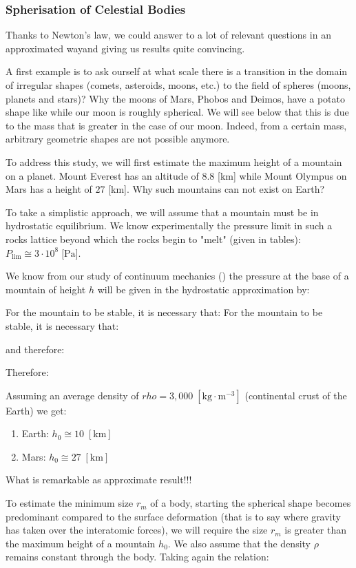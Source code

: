 	\subsubsection{Spherisation of Celestial Bodies}
	Thanks to Newton's law, we could answer to a lot of relevant questions in an approximated wayand giving us results quite convincing.

	A first example is to ask ourself at what scale there is a transition in the domain of irregular shapes (comets, asteroids, moons, etc.) to the field of spheres (moons, planets and stars)? Why the moons of Mars, Phobos and Deimos, have a potato shape like while our moon is roughly spherical. We will see below that this is due to the mass that is greater in the case of our moon. Indeed, from a certain mass, arbitrary geometric shapes are not possible anymore.

	To address this study, we will first estimate the maximum height of a mountain on a planet. Mount Everest has an altitude of $8.8$ [km] while Mount Olympus on Mars has a height of $27$ [km]. Why such mountains can not exist on Earth?

	To take a simplistic approach, we will assume that a mountain must be in hydrostatic equilibrium. We know experimentally the pressure limit in such a rocks lattice beyond which the rocks begin to "melt" (given in tables): $P_{\text{lim}}\cong 3 \cdot 10^8\;\text{[Pa]}$.

	We know from our study of continuum mechanics () the pressure at the base of a mountain of height $h$ will be given in the hydrostatic approximation by:
	
	For the mountain to be stable, it is necessary that:
	For the mountain to be stable, it is necessary that:
	
	and therefore:
	
	Therefore:
	
	Assuming an average density of $rho=3,000\;[\text{kg}\cdot \text{m}^{-3}]$ (continental crust of the Earth) we get:
	\begin{enumerate}
		\item Earth: $h_0\cong 10\; [\text{km}]$
		\item Mars: $h_0\cong 27\; [\text{km}]$
	\end{enumerate}
	What is remarkable as approximate result!!!

	To estimate the minimum size $r_m$ of a body, starting the spherical shape becomes predominant compared to the surface deformation (that is to say where gravity has taken over the interatomic forces), we will require the size $r_m$ is greater than the maximum height of a mountain $h_0$. We also assume that the density $\rho$ remains constant through the body. Taking again the relation:
	
